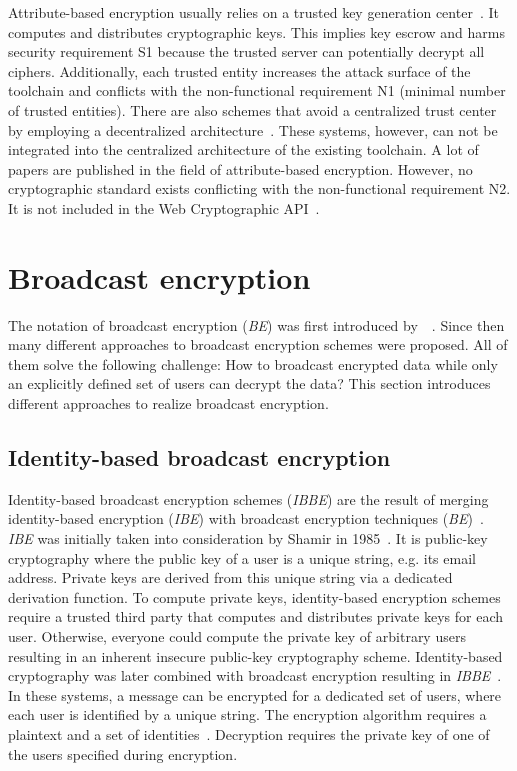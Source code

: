 \documentclass[../main.tex]{subfiles}
\begin{document}
Attribute-based encryption usually relies on a trusted key generation center~\cite{Sahai2009}.
It computes and distributes cryptographic keys.
This implies key escrow and harms security requirement S1 because the trusted server can potentially decrypt all ciphers.
Additionally, each trusted entity increases the attack surface of the toolchain and conflicts with the non-functional requirement N1 (minimal number of trusted entities).
There are also schemes that avoid a centralized trust center by employing a decentralized architecture~\cite{Vaanchig2018}.
These systems, however, can not be integrated into the centralized architecture of the existing toolchain.
A lot of papers are published in the field of attribute-based encryption.
However, no cryptographic standard exists conflicting with the non-functional requirement N2.
It is not included in the Web Cryptographic API~\cite{WebCryptoApi2017}.

\section{Broadcast encryption}
\label{sec:broadcast-encryption}

The notation of broadcast encryption (\textit{BE}) was first introduced by~\citeauthor{fiat1993broadcast}~\cite{fiat1993broadcast}. 
Since then many different approaches to broadcast encryption schemes were proposed. 
All of them solve the following challenge: 
How to broadcast encrypted data while only an explicitly defined set of users can decrypt the data?
This section introduces different approaches to realize broadcast encryption.


\subsection{Identity-based broadcast encryption} 
\label{sec:broadcast-identity}

Identity-based broadcast encryption schemes (\textit{IBBE}) are the result of merging identity-based encryption (\textit{IBE}) with broadcast encryption techniques (\textit{BE})~\cite{Sakai2007}.
\textit{IBE} was initially taken into consideration by Shamir in 1985~\cite{shamir1985}.
It is public-key cryptography where the public key of a user is a unique string, e.g. its email address. 
Private keys are derived from this unique string via a dedicated derivation function. 
To compute private keys, identity-based encryption schemes require a trusted third party that computes and distributes private keys for each user.
Otherwise, everyone could compute the private key of arbitrary users resulting in an inherent insecure public-key cryptography scheme.
Identity-based cryptography was later combined with broadcast encryption resulting in \textit{IBBE}~\cite{Sakai2007}.
In these systems, a message can be encrypted for a dedicated set of users, where each user is identified by a unique string.
The encryption algorithm requires a plaintext and a set of identities~\cite{shamir1985}.
Decryption requires the private key of one of the users specified during encryption.
\end{document}
